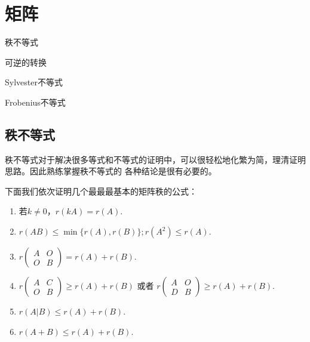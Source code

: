 \chapter{矩阵}

\begin{introduction}
	\item 秩不等式
	\item 可逆的转换
	\item Sylvester不等式
	\item Frobenius不等式
\end{introduction}

\section{秩不等式}

秩不等式对于解决很多等式和不等式的证明中，可以很轻松地化繁为简，理清证明思路。因此熟练掌握秩不等式的
各种结论是很有必要的。

下面我们依次证明几个最最最基本的矩阵秩的公式：
\begin{lemma}
	\begin{enumerate}[(1)]
		\item 若$k \neq 0$，$r(kA)=r(A)$.
		\item $r(AB) \leq \min\{r(A), r(B) \}; r(A^2) \leq r(A)$.
		\item $r \begin{pmatrix}
			A & O \\
			O & B 
		\end{pmatrix}=r(A) + r(B)$.
		\item $r \begin{pmatrix}
			A & C \\
			O & B 
		\end{pmatrix} \geq r(A) + r(B)$ 或者 $r \begin{pmatrix}
			A & O \\
			D & B 
		\end{pmatrix} \geq r(A) + r(B)$. 
		\item $r(A \vert B)\leq r(A) + r(B)$.
		\item $r(A + B) \leq r(A) + r(B)$.
	\end{enumerate}
\end{lemma}

